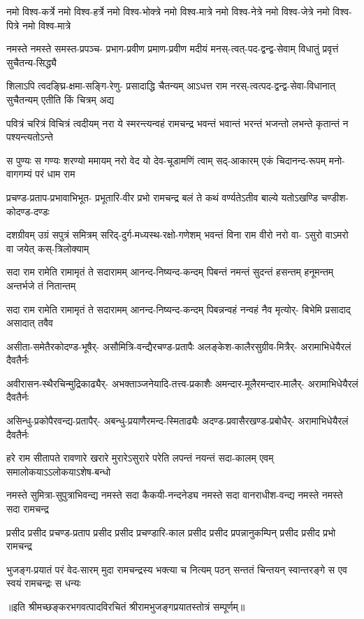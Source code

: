 \fourlineindentedshloka
{नमो विश्व-कर्त्रे नमो विश्व-हर्त्रे}
{नमो विश्व-भोक्त्रे नमो विश्व-मात्रे}
{नमो विश्व-नेत्रे नमो विश्व-जेत्रे}
{नमो विश्व-पित्रे नमो विश्व-मात्रे}%

\fourlineindentedshloka
{नमस्ते नमस्ते समस्त-प्रपञ्च-}
{प्रभाग-प्रवीण प्रमाण-प्रवीण}
{मदीयं मनस्-त्वत्-पद-द्वन्द्व-सेवाम्}
{विधातुं प्रवृत्तं सुचैतन्य-सिद्ध्यै}%

\fourlineindentedshloka
{शिलाऽपि त्वदङ्घ्रि-क्षमा-सङ्गि-रेणु-}
{प्रसादाद्धि चैतन्यम् आऽधत्त राम}
{नरस्-त्वत्पद-द्वन्द्व-सेवा-विधानात्}
{सुचैतन्यम् एतीति किं चित्रम् अद्य}%

\fourlineindentedshloka
{पवित्रं चरित्रं विचित्रं त्वदीयम्}
{नरा ये स्मरन्त्यन्वहं रामचन्द्र}
{भवन्तं भवान्तं भरन्तं भजन्तो}
{लभन्ते कृतान्तं न पश्यन्त्यतोऽन्ते}%

\fourlineindentedshloka
{स पुण्यः स गण्यः शरण्यो ममायम्}
{नरो वेद यो देव-चूडामणिं त्वाम्}
{सद्-आकारम् एकं चिदानन्द-रूपम्}
{मनो-वागगम्यं परं धाम राम}%

\fourlineindentedshloka
{प्रचण्ड-प्रताप-प्रभावाभिभूत-}
{प्रभूतारि-वीर प्रभो रामचन्द्र}
{बलं ते कथं वर्ण्यतेऽतीव बाल्ये}
{यतोऽखण्डि चण्डीश-कोदण्ड-दण्डः}%

\fourlineindentedshloka
{दशग्रीवम् उग्रं सपुत्रं समित्रम्}
{सरिद्-दुर्ग-मध्यस्थ-रक्षो-गणेशम्}
{भवन्तं विना राम वीरो नरो वा-}
{ऽसुरो वाऽमरो वा जयेत् कस्-त्रिलोक्याम्}%

\fourlineindentedshloka
{सदा राम रामेति रामामृतं ते}
{सदारामम् आनन्द-निष्यन्द-कन्दम्}
{पिबन्तं नमन्तं सुदन्तं हसन्तम्}
{हनूमन्तम् अन्तर्भजे तं नितान्तम्}%

\fourlineindentedshloka
{सदा राम रामेति रामामृतं ते}
{सदारामम् आनन्द-निष्यन्द-कन्दम्}
{पिबन्नन्वहं नन्वहं नैव मृत्योर्-}
{बिभेमि प्रसादाद् असादात् तवैव}%

\fourlineindentedshloka
{असीता-समेतैरकोदण्ड-भूषैर्-}
{असौमित्रि-वन्द्यैरचण्ड-प्रतापैः}
{अलङ्केश-कालैरसुग्रीव-मित्रैर्-}
{अरामाभिधेयैरलं दैवतैर्नः}%

\fourlineindentedshloka
{अवीरासन-स्थैरचिन्मुद्रिकाढ्यैर्-}
{अभक्ताञ्जनेयादि-तत्त्व-प्रकाशैः}
{अमन्दार-मूलैरमन्दार-मालैर्-}
{अरामाभिधेयैरलं दैवतैर्नः}%

\fourlineindentedshloka
{असिन्धु-प्रकोपैरवन्द्य-प्रतापैर्-}
{अबन्धु-प्रयाणैरमन्द-स्मिताढ्यैः}
{अदण्ड-प्रवासैरखण्ड-प्रबोधैर्-}
{अरामाभिधेयैरलं दैवतैर्नः}%

\fourlineindentedshloka
{हरे राम सीतापते रावणारे}
{खरारे मुरारेऽसुरारे परेति}
{लपन्तं नयन्तं सदा-कालम् एवम्}
{समालोकयाऽऽलोकयाऽशेष-बन्धो}%

\fourlineindentedshloka
{नमस्ते सुमित्रा-सुपुत्राभिवन्द्य}
{नमस्ते सदा कैकयी-नन्दनेड्य}
{नमस्ते सदा वानराधीश-वन्द्य}
{नमस्ते नमस्ते सदा रामचन्द्र}%

\fourlineindentedshloka
{प्रसीद प्रसीद प्रचण्ड-प्रताप}
{प्रसीद प्रसीद प्रचण्डारि-काल}
{प्रसीद प्रसीद प्रपन्नानुकम्पिन्}
{प्रसीद प्रसीद प्रभो रामचन्द्र}%

\fourlineindentedshloka
{भुजङ्ग-प्रयातं परं वेद-सारम्}
{मुदा रामचन्द्रस्य भक्त्या च नित्यम्}
{पठन् सन्ततं चिन्तयन् स्वान्तरङ्गे}
{स एव स्वयं रामचन्द्रः स धन्यः}%

{॥इति श्रीमच्छङ्करभगवत्पादविरचितं श्रीरामभुजङ्गप्रयातस्तोत्रं सम्पूर्णम्॥}

\closesection

